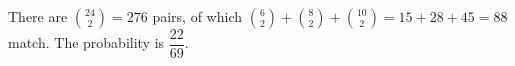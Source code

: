 There are $\binom{24}{2}=276$ pairs, of which $\binom62+\binom82+\binom{10}{2}=15+28+45=88$ match. The probability is $\boxed{\dfrac{22}{69}}$.
